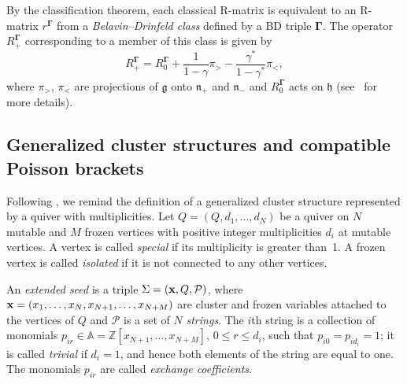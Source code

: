 \documentclass{amsart}
\theoremstyle{definition}
\theoremstyle{remark}
\numberwithin{equation}{section}
\numberwithin{theorem}{section}
\def\AA{{\mathbb A}}
\def\F{{\mathbb F}}
\def\P{{\mathcal P}}
\def\Z{{\mathbb Z}}
\def\bfG{\mathbf \Gamma}
\def\g{\mathfrak g}
\def\h{\mathfrak h}
\def\n{\mathfrak n}
\def\x{{\bf x}}
\begin{document}
 By the classification theorem, each classical R-matrix is equivalent to an R-matrix $r^\bfG$ from a {\it Belavin--Drinfeld class\/} defined by a BD triple $\bfG$. The operator $R^\bfG_+$ corresponding
to a member of this class is given by
\begin{equation}
\label{Rplusgamma}
R^\bfG_+=R_0^\bfG+\frac1{1-\gamma}\pi_{>}-\frac{\gamma^*}{1-\gamma^*}\pi_{<},
\end{equation}
where $\pi_{>}$, $\pi_{<}$ are projections of  
$\g$ onto $\n_+$ and $\n_-$ and $R_0^\bfG$ acts on $\h$ (see~\cite{GSVple} for more details).  


\subsection{Generalized cluster structures and compatible Poisson brackets}
Following \cite{GSVdouble, GSVnewdouble}, we remind the definition of a generalized cluster structure represented by a quiver with multiplicities. Let $Q=(Q,d_1,\dots,d_N)$ be
a quiver on $N$ mutable and $M$ frozen vertices with positive integer multiplicities $d_i$ at mutable vertices. 
A vertex is called {\it special\/} if its multiplicity is greater than~1. 
A frozen vertex is called {\it isolated\/} if it is not connected to any other vertices. 

An {\em extended seed\/} %
is a triple $\Sigma=(\x,Q,\P)$, where $\x=(x_1,\dots,x_N, x_{N+1},\dots,\allowbreak x_{N+M})$ are
cluster and frozen variables attached to the vertices of $Q$
and $\P$ is a set of $N$ {\em strings}. The $i$th string is a collection of 
monomials $p_{ir}\in\AA=\Z[x_{N+1},\dots,x_{N+M}]$,
 $0\le r\le d_i$, such that  
$p_{i0}=p_{id_i}=1$; it is called {\em trivial\/} if $d_i=1$, and hence both elements of the string are equal to one.
The monomials $p_{ir}$ are called {\em exchange coefficients}.
\end{document}
